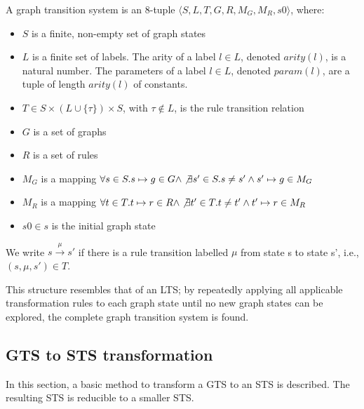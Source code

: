 \begin{definition}
A graph transition system is an 8-tuple	$\langle S, L, T, G, R, M_G, M_R, s0\rangle$, where:
\begin{itemize}
\item $S$ is a finite, non-empty set of graph states
\item $L$ is a finite set of labels. The arity of a label $l\in L$, denoted $arity(l)$, is a natural number. The parameters of a label $l\in L$, denoted $param(l)$, are a tuple of length $arity(l)$ of constants.
\item $T \in S \times (L \cup \{\tau\}) \times S$, with $\tau \notin L$, is the rule transition relation
\item $G$ is a set of graphs
\item $R$ is a set of rules
\item $M_G$ is a mapping $\forall s \in S . s \mapsto g \in G \land \not\exists s' \in S . s \neq s' \land s' \mapsto g \in M_G$
\item $M_R$ is a mapping $\forall t \in T . t \mapsto r \in R \land \not\exists t' \in T . t \neq t' \land t' \mapsto r \in M_R$
\item $s0 \in s$ is the initial graph state
\end{itemize}
We write $s \xrightarrow{\mu}s'$ if there is a rule transition labelled $\mu$ from state s to state s', i.e., $(s, \mu, s') \in T$.
\end{definition}

This structure resembles that of an LTS; by repeatedly applying all applicable transformation rules to each graph state until no new graph states can be explored, the complete graph transition system is found.

\subsection{GTS to STS transformation}
In this section, a basic method to transform a GTS to an STS is described. The resulting STS is reducible to a smaller STS.

